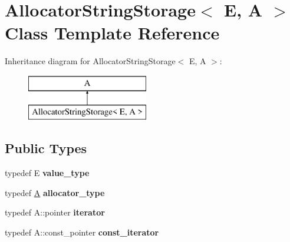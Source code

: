 \hypertarget{classAllocatorStringStorage}{}\section{Allocator\+String\+Storage$<$ E, A $>$ Class Template Reference}
\label{classAllocatorStringStorage}
Inheritance diagram for Allocator\+String\+Storage$<$ E, A $>$\+:\begin{figure}[H]
\begin{center}
\leavevmode
\includegraphics[height=2.000000cm]{classAllocatorStringStorage}
\end{center}
\end{figure}
\subsection*{Public Types}
\begin{DoxyCompactItemize}
\item 
\hypertarget{classAllocatorStringStorage_afe4d57372168f5504578b10aefdbb051}{}typedef E {\bfseries value\+\_\+type}\label{classAllocatorStringStorage_afe4d57372168f5504578b10aefdbb051}

\item 
\hypertarget{classAllocatorStringStorage_a9bef419c6a181673f0b556cd26b858d0}{}typedef \hyperlink{structA}{A} {\bfseries allocator\+\_\+type}\label{classAllocatorStringStorage_a9bef419c6a181673f0b556cd26b858d0}

\item 
\hypertarget{classAllocatorStringStorage_a4ddb1c8b31388ef3c0186bd9b5d454d0}{}typedef A\+::pointer {\bfseries iterator}\label{classAllocatorStringStorage_a4ddb1c8b31388ef3c0186bd9b5d454d0}

\item 
\hypertarget{classAllocatorStringStorage_ad7519e066d027616d6d7a1c221416c7e}{}typedef A\+::const\+\_\+pointer {\bfseries const\+\_\+iterator}\label{classAllocatorStringStorage_ad7519e066d027616d6d7a1c221416c7e}

\end{DoxyCompactItemize}
